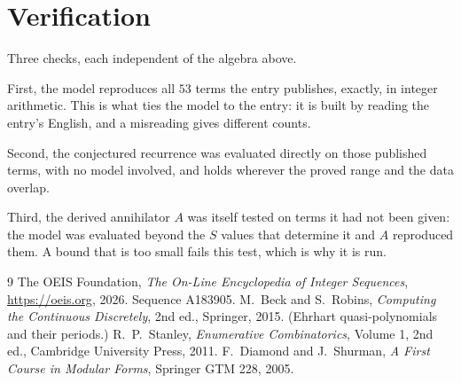 \documentclass[11pt,a4paper]{article}
\theoremstyle{plain}
\theoremstyle{definition}
\begin{document}
\section{Verification}

Three checks, each independent of the algebra above.

First, the model reproduces all $53$ terms the entry publishes, exactly, in integer
arithmetic. This is what ties the model to the entry: it is built by reading the entry's
English, and a misreading gives different counts.

Second, the conjectured recurrence was evaluated directly on those published terms, with no
model involved, and holds wherever the proved range and the data overlap.

Third, the derived annihilator $A$ was itself tested on terms it had not been given: the model
was evaluated beyond the $S$ values that determine it and $A$ reproduced them. A bound that is
too small fails this test, which is why it is run.

\begin{thebibliography}{9}
 The OEIS Foundation, \emph{The On-Line Encyclopedia of Integer
Sequences}, \url{https://oeis.org}, 2026. Sequence A183905.
 M.~Beck and S.~Robins, \emph{Computing the Continuous Discretely},
2nd ed., Springer, 2015. (Ehrhart quasi-polynomials and their periods.)
 R.~P.~Stanley, \emph{Enumerative Combinatorics}, Volume 1, 2nd ed.,
Cambridge University Press, 2011.
 F.~Diamond and J.~Shurman, \emph{A First Course in Modular Forms},
Springer GTM 228, 2005.
\end{thebibliography}
\end{document}
